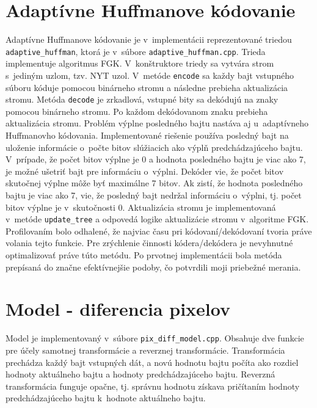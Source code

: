 \documentclass[10pt,a4paper]{article}
\begin{document}
\section{Adaptívne Huffmanove kódovanie}

Adaptívne Huffmanove kódovanie je v~implementácii reprezentované triedou \texttt{adaptive\_huffman}, ktorá je v~súbore \texttt{adaptive\_huffman.cpp}. Trieda implementuje algoritmus FGK. V~konštruktore triedy sa vytvára strom s~jediným uzlom, tzv. NYT uzol. V~metóde \texttt{encode} sa každy bajt vstupného súboru kóduje pomocou binárneho stromu a následne prebieha aktualizácia stromu. Metóda \texttt{decode} je zrkadlová, vstupné bity sa dekódujú na znaky pomocou binárneho stromu. Po každom dekódovanom znaku prebieha aktualizácia stromu. Problém výplne posledného bajtu nastáva aj u~adaptívneho Huffmanovho kódovania. Implementované riešenie používa posledný bajt na uloženie informácie o~počte bitov slúžiacich ako výplň predchádzajúceho bajtu. V~prípade, že počet bitov výplne je 0 a hodnota posledného bajtu je viac ako 7, je možné ušetriť bajt pre informáciu o~výplni. Dekóder vie, že počet bitov skutočnej výplne môže byť maximálne 7 bitov. Ak zistí, že hodnota posledného bajtu je viac ako 7, vie, že posledný bajt nedržal informáciu o~výplni, tj. počet bitov výplne je v~skutočnosti 0. Aktualizácia stromu je implementovaná v~metóde \texttt{update\_tree} a odpovedá logike aktualizácie stromu v~algoritme FGK. Profilovaním bolo odhalené, že najviac času pri kódovaní/dekódovaní tvoria práve volania tejto funkcie. Pre zrýchlenie činnosti kódera/dekódera je nevyhnutné optimalizovať práve túto metódu. Po prvotnej implementácii bola metóda prepísaná do značne efektívnejšie podoby, čo potvrdili moji priebežné merania.

\section{Model \-- diferencia pixelov}

Model je implementovaný v~súbore \texttt{pix\_diff\_model.cpp}. Obsahuje dve funkcie pre účely samotnej transformácie a reverznej transformácie. Transformácia prechádza každý bajt vstupných dát, a novú hodnotu bajtu počíta ako rozdiel hodnoty aktuálneho bajtu a hodnoty predchádzajúceho bajtu. Reverzná transformácia funguje opačne, tj. správnu hodnotu získava pričítaním hodnoty predchádzajúceho bajtu k~hodnote aktuálneho bajtu.
\end{document}
